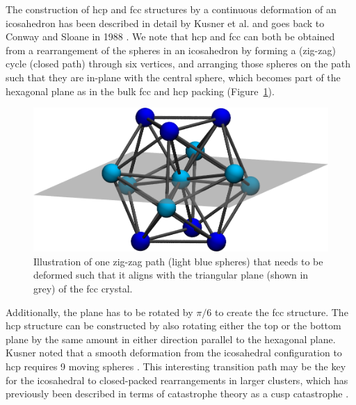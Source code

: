 The construction of hcp and fcc structures by a continuous deformation of an
icosahedron has been described in detail by Kusner et al.
\autocite{Kusner_ConfigurationSpacesEqual_2016} and goes back to Conway and Sloane
in 1988 \autocite{conway-2013book}. We note that hcp and fcc can both be obtained
from a rearrangement of the spheres in an icosahedron by forming a (zig-zag)
cycle (closed path) through six vertices, and arranging those spheres on the
path such that they are in-plane with the central sphere, which becomes part of
the hexagonal plane as in the bulk fcc and hcp packing
(Figure~\ref{fig:ico-fcc-trans}).
\begin{figure}[htb]
    \centering
    \includegraphics[width=.8\columnwidth]{gregory-newton/plane.png}
    \caption{Illustration of one zig-zag path (light blue spheres) that needs
    to be deformed such that it aligns with the triangular plane (shown in
    grey) of the fcc crystal.}
    \label{fig:ico-fcc-trans}
\end{figure}
Additionally, the plane has to be rotated by $\pi/6$ to create the fcc
structure. The hcp structure can be constructed by also rotating either the top
or the bottom plane by the same amount in either direction parallel to the
hexagonal plane. Kusner noted that a smooth deformation from the icosahedral
configuration to hcp requires 9 moving spheres
\autocite{Kusner_ConfigurationSpacesEqual_2016}. This interesting transition path
may be the key for the icosahedral to closed-packed rearrangements in larger
clusters, which has previously been described in terms of catastrophe theory as
a cusp catastrophe \autocite{Wales_MicroscopicBasisGlobal_2001}. 

